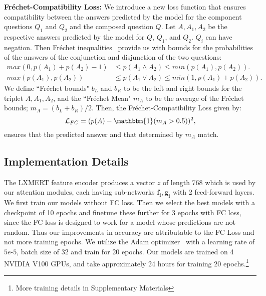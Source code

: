         \noindent\textbf{Fréchet-Compatibility Loss:}
        We introduce a new loss function that ensures compatibility between the answers predicted by the model for the component questions $Q_1$ and $Q_2$ and the composed question $Q$.
        Let $A, A_1, A_2$ be the respective answers predicted by the model for $Q$, $Q_1$, and $Q_2$. $Q_i$ can have negation.
        Then Fréchet inequalities~\citep{boole1854investigation,frechet1935generalisation} provide us with bounds for the probabilities of the answers of the conjunction and disjunction of the two questions:
        \begin{align}
            \mathit{max}(0, p(A_1)+p(A_2)-1) &\leq p(A_1 \wedge A_2) \leq \mathit{min}(p(A_1), p(A_2)). \\
            \mathit{max}(p(A_1), p(A_2)) &\leq p(A_1 \vee A_2) \leq \mathit{min}(1, p(A_1) + p(A_2)).
        \end{align}
        We define ``Fréchet bounds" $b_L$ and $b_R$ to be the left and right bounds for the triplet $A, A_1, A_2$,
        and the ``Fréchet Mean" $m_A$ to be the average of the Fréchet bounds; $m_A = (b_L + b_R)/2$.
        Then, the Fréchet-Compatibility Loss given by:
        \begin{equation}
            \mathcal{L}_{FC} = (p(A) - \mathbbm{1}(m_A > 0.5))^2, 
        \end{equation}
        ensures that the predicted answer and that determined by $m_A$ match. 

    \subsection{Implementation Details}
    The LXMERT feature encoder produces a vector $z$ of length 768 which is used by our attention modules, each having sub-networks $\mathbf{f_i}, \mathbf{g_i}$ with 2 feed-forward layers.
    We first train our models without FC loss.
    Then we select the best models with a checkpoint of 10 epochs and finetune these further for 3 epochs with FC loss, since the FC loss is designed to work for a model whose predictions are not random.
    Thus our improvements in accuracy are attributable to the FC Loss and not more training epochs.
    We utilize the Adam optimizer~\citep{kingma2014adam} with a learning rate of $5\textit{e-}5$, batch size of 32 and train for 20 epochs.
    Our models are trained on 4 NVIDIA V100 GPUs, and take approximately 24 hours for training 20 epochs.\footnote{More training details in Supplementary Materials}
    

